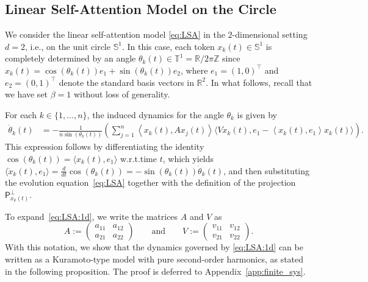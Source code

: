 \documentclass[10pt]{article}
\theoremstyle{definition}
\theoremstyle{definition}
\numberwithin{equation}{section}
\newcommand{\R}{\mathbb{R}}
\newcommand{\BBS}{\mathbb{S}}
\newcommand{\BBT}{\mathbb{T}}
\renewcommand{\P}{\mathsf{P}}
\newcommand{\Dtheta}{\Dot{\theta}}
\begin{document}
\subsection{Linear Self-Attention Model on the Circle}\label{subsec:LSA}
We consider the linear self-attention model \eqref{eq:LSA} in the $2$-dimensional setting $d=2$, i.e., on the unit circle $\BBS^{1}$.
In this case, each token $x_k(t) \in \BBS^1$ is completely determined by an angle $\theta_k(t) \in \BBT^1 = \R/2\pi \mathbb{Z}$ since $x_k(t) = \cos(\theta_k(t)) e_1 + \sin(\theta_k(t)) e_2$, where $e_1 = (1,0)^\top$ and $e_2 = (0,1)^\top$ denote the standard basis vectors in $\R^2$. In what follows, recall that we have set $\beta=1$ without loss of generality.

For each $k \in \{1,\dots,n\}$, the induced dynamics for the angle $\theta_k$ is given by
\begin{equation}
\label{eq:LSA:1d}
\begin{split}
    \Dtheta_k(t)
    &= -\frac{1}{n \sin (\theta_k(t))} \left( \sum_{j=1}^n  \left\langle x_k(t), A x_j(t) \right\rangle  \big\langle V x_k(t), e_1 - \left\langle x_k(t), e_1 \right\rangle x_k(t) \big\rangle \right).
\end{split}
\end{equation}
This expression follows by differentiating the identity $\cos(\theta_k(t)) = \langle x_k(t), e_1 \rangle$ w.r.t.\@ time $t$, which yields $\langle \Dot{x}_k(t), e_1 \rangle=\frac{d}{dt}\cos(\theta_k(t)) = -\sin(\theta_k(t))\Dtheta_k(t)$, and then substituting the evolution equation~\eqref{eq:LSA} together with the definition of the projection~$\P_{x_k(t)}^{\perp}$.

To expand~\eqref{eq:LSA:1d}, we write the matrices $A$ and $V$ as
\begin{equation}\label{eq:matrices_A_V_general}
A := \left(\begin{array}{ll}
    a_{11} & a_{12} \\
    a_{21} & a_{22} 
\end{array} \right)
    \qquad
    \text{and}
    \qquad
V := \left( \begin{array}{ll}
    v_{11} & v_{12}  \\
    v_{21} & v_{22} 
\end{array} \right).
\end{equation}
With this notation, we show that the dynamics governed by \eqref{eq:LSA:1d} can be written as a Kuramoto-type model with pure second-order harmonics, as stated in the following proposition.
The proof is deferred to Appendix~\ref{app:finite_sys}.
\end{document}
